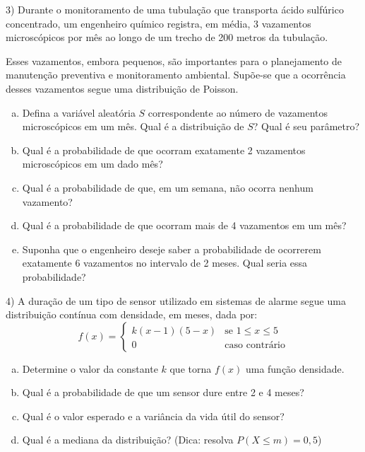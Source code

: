 \documentclass{article}
\begin{document}
\vspace{5px}

3) Durante o monitoramento de uma tubulação que transporta ácido sulfúrico concentrado, um engenheiro químico registra, em média, 3 vazamentos microscópicos por mês ao longo de um trecho de 200 metros da tubulação.

Esses vazamentos, embora pequenos, são importantes para o planejamento de manutenção preventiva e monitoramento ambiental. Supõe-se que a ocorrência desses vazamentos segue uma distribuição de Poisson.

\begin{enumerate}[a)]
    \item Defina a variável aleatória \( S \) correspondente ao número de vazamentos microscópicos em um mês. Qual é a distribuição de \( S \)? Qual é seu parâmetro?

    \item Qual é a probabilidade de que ocorram exatamente 2 vazamentos microscópicos em um dado mês?

    \item Qual é a probabilidade de que, em um semana, não ocorra nenhum vazamento?

    \item Qual é a probabilidade de que ocorram mais de 4 vazamentos em um mês?

    \item Suponha que o engenheiro deseje saber a probabilidade de ocorrerem exatamente 6 vazamentos no intervalo de 2 meses. Qual seria essa probabilidade?
\end{enumerate}

\vspace{5px}

4) A duração de um tipo de sensor utilizado em sistemas de alarme segue uma distribuição contínua com densidade, em meses, dada por:
\[
f(x) = 
\begin{cases}
k(x - 1)(5 - x) & \text{se } 1 \leq x \leq 5\\
0 & \text{caso contrário}
\end{cases}
\]

\begin{enumerate}[a)]
    \item Determine o valor da constante \( k \) que torna \( f(x) \) uma função densidade.
    
    \item Qual é a probabilidade de que um sensor dure entre 2 e 4 meses?
    
    \item Qual é o valor esperado  e a variância da vida útil do sensor?
    
    \item Qual é a mediana da distribuição? (Dica: resolva \( P(X \leq m) = 0{,}5 \))
\end{enumerate}
\end{document}
